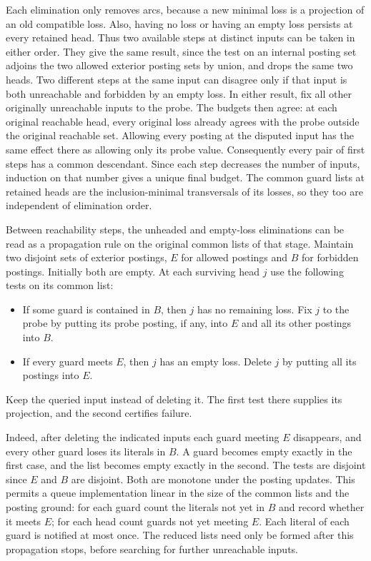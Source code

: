 Each elimination only removes arcs, because a new
minimal loss is a projection of an old compatible loss.
Also, having no loss or having an empty loss persists
at every retained head. Thus two available steps at
distinct inputs can be taken in either order. They give
the same result, since the test on an internal posting
set adjoins the two allowed exterior posting sets by
union, and drops the same two heads. Two different
steps at the same input can disagree only if that input
is both unreachable and forbidden by an empty loss.
In either result, fix all other originally unreachable
inputs to the probe. The budgets then agree: at each
original reachable head, every original loss already
agrees with the probe outside the original reachable
set. Allowing every posting at the disputed input has
the same effect there as allowing only its probe value.
Consequently every pair of first steps has a common
descendant. Since each step decreases the number of
inputs, induction on that number gives a unique final
budget. The common guard lists at retained heads are
the inclusion-minimal transversals of its losses, so
they too are independent of elimination order.

Between reachability steps, the unheaded and
empty-loss eliminations can be read as a propagation
rule on the original common lists of that stage.
Maintain two disjoint sets of exterior postings,
$E$ for allowed postings and $B$ for forbidden
postings. Initially both are empty. At each surviving
head $j$ use the following tests on its common list:
\begin{itemize}
\item If some guard is contained in $B$, then $j$
has no remaining loss. Fix $j$ to the probe by
putting its probe posting, if any, into $E$ and all
its other postings into $B$.
\item If every guard meets $E$, then $j$ has an
empty loss. Delete $j$ by putting all its postings
into $E$.
\end{itemize}
Keep the queried input instead of deleting it. The
first test there supplies its projection, and the
second certifies failure.

Indeed, after deleting the indicated inputs each guard
meeting $E$ disappears, and every other guard loses
its literals in $B$. A guard becomes empty exactly
in the first case, and the list becomes empty exactly
in the second. The tests are disjoint since $E$ and
$B$ are disjoint. Both are monotone under the posting
updates. This permits a queue implementation linear
in the size of the common lists and the posting
ground: for each guard count the literals not yet in
$B$ and record whether it meets $E$; for each head
count guards not yet meeting $E$. Each literal of
each guard is notified at most once. The reduced lists
need only be formed after this propagation stops,
before searching for further unreachable inputs.


